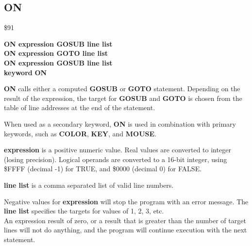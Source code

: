 \subsection{ON}
\begin{description}[leftmargin=2cm,style=nextline]
\item [Token:] \$91
\item [Format:] {\bf ON expression GOSUB line list} \\
                {\bf ON expression GOTO line list}  \\
                {\bf ON expression GOSUB line list} \\
                {\bf keyword} {\bf ON}
\item [Usage:]  {\bf ON} calls
                either a computed {\bf GOSUB} or {\bf GOTO} statement.
                Depending on the result of the expression, the target
                for {\bf GOSUB} and {\bf GOTO} is chosen from
                the table of line addresses at the end of the statement.

                When used as a secondary keyword, {\bf ON} is used in
                combination with primary keywords, such as
                {\bf COLOR}, {\bf KEY}, and  {\bf MOUSE}.

                {\bf expression} is a positive numeric value.
                Real values are converted to integer (losing precision).
                Logical operands are converted to a 16-bit integer,
                using \$FFFF (decimal -1) for TRUE,
                and \$0000 (decimal 0) for FALSE.

                {\bf line list} is a comma separated list of valid
                line numbers.

\item [Remarks:] Negative values for {\bf expression} will stop
                 the program with an error message.
                 The {\bf line list} specifies the targets for values
                 of 1, 2, 3, etc. \\
                 An expression result of zero, or a result that is greater
                 than the number of target lines will not do anything, and the
                 program will continue execution with the next statement.


\end{description}
